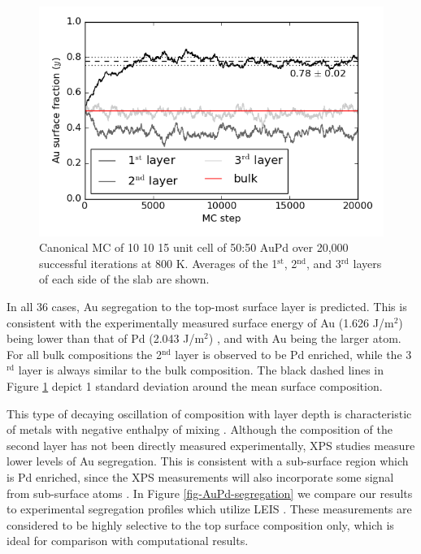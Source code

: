 \documentclass[12pt]{cmuthesis}
\begin{document}
\begin{figure}[htbp]
\centering
\includegraphics[width=5in]{./images/AuPd-MC.png}
\caption{\label{fig-AuPd-MC}
Canonical MC of 10 \texttimes{} 10 \texttimes{} 15 unit cell of 50:50 AuPd over 20,000 successful iterations at 800 K. Averages of the 1\(^{\text{st}}\), 2\(^{\text{nd}}\), and 3\(^{\text{rd}}\) layers of each side of the slab are shown.}
\end{figure}

In all 36 cases, Au segregation to the top-most surface layer is predicted. This is consistent with the experimentally measured surface energy of Au (1.626 J/m\(^{\text{2}}\)) being lower than that of Pd (2.043 J/m\(^{\text{2}}\)) \cite{mezey-1982-surfac-free}, and with Au being the larger atom. For all bulk compositions the 2\(^{\text{nd}}\) layer is observed to be Pd enriched, while the 3\(^{\text{rd}}\) layer is always similar to the bulk composition. The black dashed lines in Figure \ref{fig-AuPd-MC} depict \textpm{} 1 standard deviation around the mean surface composition.

This type of decaying oscillation of composition with layer depth is characteristic of metals with negative enthalpy of mixing \cite{dowben-1990-surfac-segreg-phenom}. Although the composition of the second layer has not been directly measured experimentally, XPS studies measure lower levels of Au segregation. This is consistent with a sub-surface region which is Pd enriched, since the XPS measurements will also incorporate some signal from sub-surface atoms \cite{yi-2005-compos-struc}. In Figure \ref{fig-AuPd-segregation} we compare our results to  experimental segregation profiles which utilize LEIS \cite{swartzfager-1981-differ-sputt,yi-2005-compos-struc}. These measurements are considered to be highly selective to the top surface composition only, which is ideal for comparison with computational results.
\end{document}

